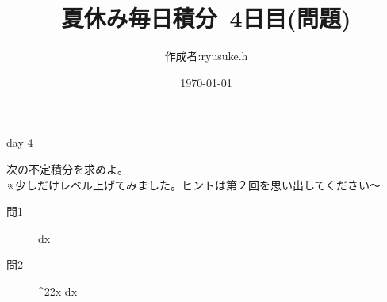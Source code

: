 \documentclass[12pt,a4paper]{jsarticle}
\title{夏休み毎日積分~4日目(問題)}
\date{\today}
\begin{document}
\maketitle
\begin{flushright}
    \author{作成者:ryusuke.h}
\end{flushright}
\begin{itembox}[c]{day 4 }
    \begin{center}
        次の不定積分を求めよ。\\
        ※少しだけレベル上げてみました。ヒントは第２回を思い出してください〜
    \end{center}
\end{itembox}
\begin{description}
    \item [問1] {\displaystyle}\int {} dx
\end{description}
\begin{description}
    \item [問2] \int \sin^2{2x} dx
\end{description}
\end{document}
